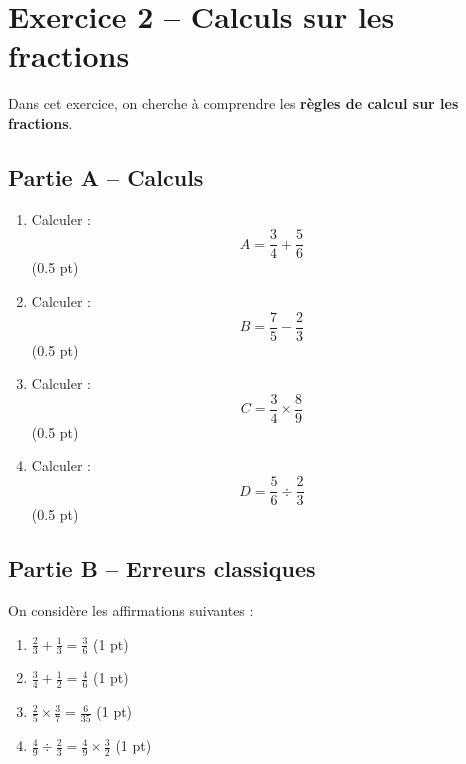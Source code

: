 \documentclass[11pt,a4paper]{article}
\begin{document}
\vspace{0.5cm}

\section*{Exercice 2 -- Calculs sur les fractions}

Dans cet exercice, on cherche à comprendre les \textbf{règles de calcul sur les fractions}.

\subsection*{Partie A -- Calculs}

\begin{enumerate}
\item Calculer :
\[
A = \frac{3}{4} + \frac{5}{6}
\] \hfill (0.5 pt)

\item Calculer :
\[
B = \frac{7}{5} - \frac{2}{3}
\] \hfill (0.5 pt)

\item Calculer :
\[
C = \frac{3}{4} \times \frac{8}{9}
\] \hfill (0.5 pt)

\item Calculer :
\[
D = \frac{5}{6} \div \frac{2}{3}
\] \hfill (0.5 pt)

\end{enumerate}

\subsection*{Partie B -- Erreurs classiques}

On considère les affirmations suivantes :

\begin{enumerate}
\item $\displaystyle \frac{2}{3} + \frac{1}{3} = \frac{3}{6}$ \hfill (1 pt)

\item $\displaystyle \frac{3}{4} + \frac{1}{2} = \frac{4}{6}$ \hfill (1 pt)

\item $\displaystyle \frac{2}{5} \times \frac{3}{7} = \frac{6}{35}$ \hfill (1 pt)

\item $\displaystyle \frac{4}{9} \div \frac{2}{3} = \frac{4}{9} \times \frac{3}{2}$ \hfill (1 pt)
\end{enumerate}
\end{document}
